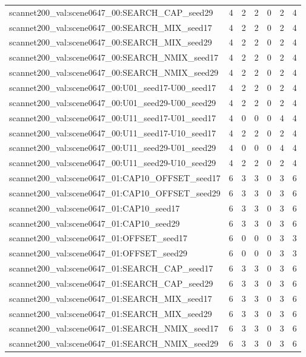 \begin{table}[t]
\begin{tabular}{lrrrrrr}
scannet200\_val:scene0647\_00:SEARCH\_CAP\_seed29 & 4 & 2 & 2 & 0 & 2 & 4 \\
scannet200\_val:scene0647\_00:SEARCH\_MIX\_seed17 & 4 & 2 & 2 & 0 & 2 & 4 \\
scannet200\_val:scene0647\_00:SEARCH\_MIX\_seed29 & 4 & 2 & 2 & 0 & 2 & 4 \\
scannet200\_val:scene0647\_00:SEARCH\_NMIX\_seed17 & 4 & 2 & 2 & 0 & 2 & 4 \\
scannet200\_val:scene0647\_00:SEARCH\_NMIX\_seed29 & 4 & 2 & 2 & 0 & 2 & 4 \\
scannet200\_val:scene0647\_00:U01\_seed17-U00\_seed17 & 4 & 2 & 2 & 0 & 2 & 4 \\
scannet200\_val:scene0647\_00:U01\_seed29-U00\_seed29 & 4 & 2 & 2 & 0 & 2 & 4 \\
scannet200\_val:scene0647\_00:U11\_seed17-U01\_seed17 & 4 & 0 & 0 & 0 & 4 & 4 \\
scannet200\_val:scene0647\_00:U11\_seed17-U10\_seed17 & 4 & 2 & 2 & 0 & 2 & 4 \\
scannet200\_val:scene0647\_00:U11\_seed29-U01\_seed29 & 4 & 0 & 0 & 0 & 4 & 4 \\
scannet200\_val:scene0647\_00:U11\_seed29-U10\_seed29 & 4 & 2 & 2 & 0 & 2 & 4 \\
scannet200\_val:scene0647\_01:CAP10\_OFFSET\_seed17 & 6 & 3 & 3 & 0 & 3 & 6 \\
scannet200\_val:scene0647\_01:CAP10\_OFFSET\_seed29 & 6 & 3 & 3 & 0 & 3 & 6 \\
scannet200\_val:scene0647\_01:CAP10\_seed17 & 6 & 3 & 3 & 0 & 3 & 6 \\
scannet200\_val:scene0647\_01:CAP10\_seed29 & 6 & 3 & 3 & 0 & 3 & 6 \\
scannet200\_val:scene0647\_01:OFFSET\_seed17 & 6 & 0 & 0 & 0 & 3 & 3 \\
scannet200\_val:scene0647\_01:OFFSET\_seed29 & 6 & 0 & 0 & 0 & 3 & 3 \\
scannet200\_val:scene0647\_01:SEARCH\_CAP\_seed17 & 6 & 3 & 3 & 0 & 3 & 6 \\
scannet200\_val:scene0647\_01:SEARCH\_CAP\_seed29 & 6 & 3 & 3 & 0 & 3 & 6 \\
scannet200\_val:scene0647\_01:SEARCH\_MIX\_seed17 & 6 & 3 & 3 & 0 & 3 & 6 \\
scannet200\_val:scene0647\_01:SEARCH\_MIX\_seed29 & 6 & 3 & 3 & 0 & 3 & 6 \\
scannet200\_val:scene0647\_01:SEARCH\_NMIX\_seed17 & 6 & 3 & 3 & 0 & 3 & 6 \\
scannet200\_val:scene0647\_01:SEARCH\_NMIX\_seed29 & 6 & 3 & 3 & 0 & 3 & 6 \\

\end{tabular}
\end{table}
